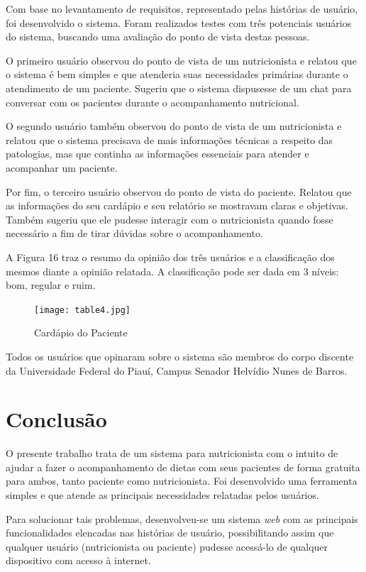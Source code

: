 \documentclass[
	12pt,				%
    oneside,			%
	a4paper,			%
	english,			%
	french,				%
	spanish,			%
	brazil,				%
	]{abntex2}
\begin{document}
Com base no levantamento de requisitos, representado pelas histórias de usuário, foi desenvolvido o sistema. Foram realizados testes com três potenciais usuários do sistema, buscando uma avaliação do ponto de vista destas pessoas.

O primeiro usuário observou do ponto de vista de um nutricionista e relatou que o sistema é bem simples e que atenderia suas necessidades primárias durante o atendimento de um paciente. Sugeriu que o sistema dispusesse de um chat para conversar com os pacientes durante o acompanhamento nutricional.

O segundo usuário também observou do ponto de vista de um nutricionista e relatou que o sistema precisava de mais informações técnicas a respeito das patologias, mas que continha as informações essenciais para atender e acompanhar um paciente.

Por fim, o terceiro usuário observou do ponto de vista do paciente. Relatou que as informações do seu cardápio e seu relatório se mostravam claras e objetivas. Também sugeriu que ele pudesse interagir com o nutricionista quando fosse necessário a fim de tirar dúvidas sobre o acompanhamento.

A Figura 16 traz o resumo da opinião dos três usuários e a classificação dos mesmos diante a opinião relatada. A classificação pode ser dada em 3 níveis: bom, regular e ruim.

\begin{figure} [hbt]
\label{cardPac} 
\caption{Cardápio do Paciente}
\begin{center}
\texttt{[image: table4.jpg]}
\end{center}
\end{figure}

Todos os usuários que opinaram sobre o sistema são membros do corpo discente da Universidade Federal do Piauí, Campus Senador Helvídio Nunes de Barros.

\chapter{Conclusão}

O presente trabalho trata de um sistema para nutricionista com o intuito de ajudar a fazer o acompanhamento de dietas com seus pacientes de forma gratuita para ambos, tanto paciente como nutricionista. Foi desenvolvido uma ferramenta simples e que atende as
principais necessidades relatadas pelos usuários.

Para solucionar tais problemas, desenvolveu-se um sistema \textit{web} com as
principais funcionalidades elencadas nas histórias de usuário, possibilitando assim
que qualquer usuário (nutricionista ou paciente) pudesse acessá-lo de qualquer
dispositivo com acesso à internet.
\end{document}

